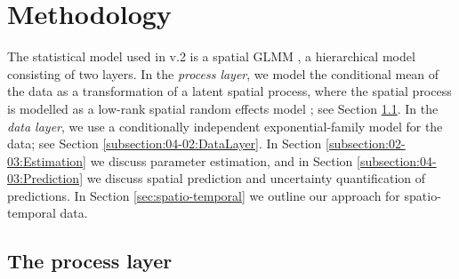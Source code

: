 \documentclass[nojss]{jss}
\begin{document}
\section{Methodology}\label{SEC:Methodology}

The statistical model used in  v.2 is a spatial GLMM \citep{Diggle_1998_spatial_GLMM}, a hierarchical model consisting of two layers.
 In the %
\textit{process layer}, we model the conditional mean of the data as a transformation of a latent spatial process, where the spatial process is modelled as a low-rank spatial random effects model \citep{Cressie_Johannesson_2008_FRK, Sengupta_Cressie_2013_spatial_GLMM_FRK}; see Section  \ref{subsection:04-01:ProcessLayer}. 
 In the %
\textit{data layer}, we use a conditionally independent exponential-family model for the data; see Section \ref{subsection:04-02:DataLayer}. 
In Section \ref{subsection:02-03:Estimation} we discuss parameter estimation, and in Section \ref{subsection:04-03:Prediction} we discuss spatial prediction and uncertainty quantification of predictions.
In Section \ref{sec:spatio-temporal} we outline our approach for spatio-temporal data. 







\subsection{The process layer} \label{subsection:04-01:ProcessLayer}
\end{document}
